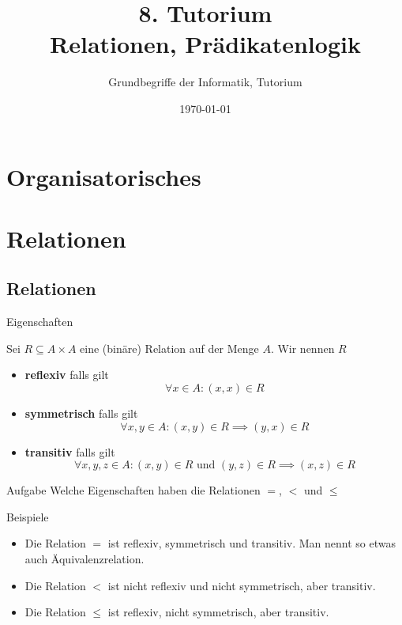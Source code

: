 




\title[Relationen, Prädikatenlogik]{8. Tutorium\\ Relationen, Prädikatenlogik}
\subtitle{Grundbegriffe der Informatik, Tutorium \hashtag\mytutnumber}
\date{\today}


\titleframe
\roadmap

\section[Orga]{Organisatorisches}



\section{Relationen}
\subsection{Relationen}
\begin{frame}{Eigenschaften}
	\begin{Definition}
		Sei $R \subseteq A \times A$ eine (binäre) Relation auf der Menge $A$. Wir nennen $R$
		\begin{itemize}[<+->]
			\item \textbf{reflexiv} falls gilt $$\forall x \in A: (x,x) \in R$$
			\item \textbf{symmetrisch} falls gilt $$\forall x,y \in A: (x,y) \in R \implies (y,x) \in R$$
			\item \textbf{transitiv} falls gilt $$\forall x,y,z \in A: (x,y) \in R \text{ und } (y,z) \in R \implies (x,z) \in R$$
		\end{itemize}
	\end{Definition}

	\pause
	\begin{exampleblock}{Aufgabe}
		Welche Eigenschaften haben die Relationen $=$, $<$ und $\leq$
	\end{exampleblock}
\end{frame}

\begin{frame}{Beispiele}
	\begin{itemize}
		\item Die Relation $=$ ist \pause reflexiv, symmetrisch und transitiv. Man nennt so etwas auch Äquivalenzrelation.
		\item \pause Die Relation $<$ ist \pause nicht reflexiv und nicht symmetrisch, aber transitiv.
		\item \pause Die Relation $\leq$ ist \pause reflexiv, nicht symmetrisch, aber transitiv.
	\end{itemize}

\end{frame}

